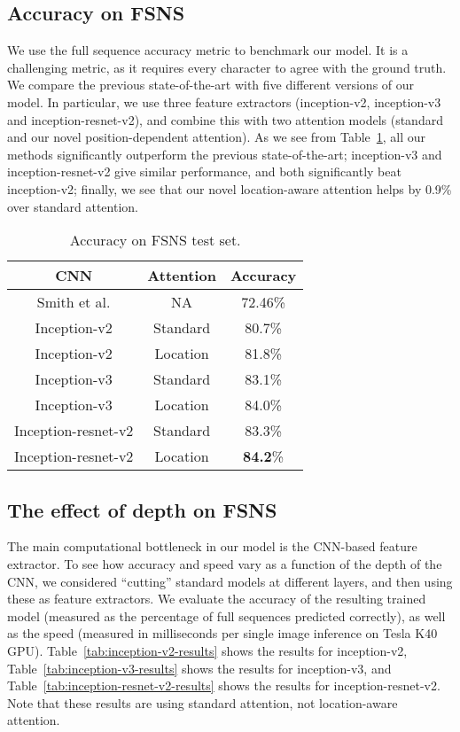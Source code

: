 \documentclass[conference]{IEEEtran}
\begin{document}
\subsection{Accuracy on FSNS}
\label{sec:accuracy}

We use the full sequence accuracy metric to benchmark our model. It is
a challenging metric, as it requires every character to agree with the
ground truth.  
We compare
the previous state-of-the-art \cite{smith2016end}
with five different versions of our model.
In particular, we use three feature extractors
(inception-v2, inception-v3 and inception-resnet-v2),
and combine this 
 with two attention
models (standard and  our novel position-dependent attention).
As we see from Table~\ref{tab:results},
all our methods significantly outperform the
previous state-of-the-art;
inception-v3 and inception-resnet-v2  give similar performance,
and both significantly beat
inception-v2;
finally, 
we see that our novel location-aware attention helps by 0.9\%
over standard attention.

\begin{table}[t]
\caption{Accuracy on FSNS test set.}
\label{tab:results}
\begin{center}
\begin{tabular}{| c | c | c |}  \hline
  CNN & Attention & Accuracy \\ \hline
Smith et al. \cite{smith2016end} & NA & 72.46\% \\ 
Inception-v2 & Standard & 80.7\% \\  
Inception-v2 & Location & 81.8\% \\
Inception-v3 & Standard & 83.1\% \\  
Inception-v3 & Location & 84.0\% \\
Inception-resnet-v2 & Standard & 83.3\% \\  
Inception-resnet-v2 & Location & {\bf 84.2}\% \\
\hline
\end{tabular}
\end{center}
\end{table}


\subsection{The effect of depth on FSNS}
\label{sec:cuts}

The main computational bottleneck in our model is the CNN-based
feature extractor. To see how accuracy and speed vary as a function of
the depth of the CNN, we considered ``cutting'' standard models at
different layers, and then using these as feature extractors.
We evaluate the accuracy of the resulting
trained model (measured as the percentage  of
full sequences predicted correctly),
as well as the speed (measured in milliseconds per single image inference on Tesla K40 GPU).
Table~\ref{tab:inception-v2-results} shows the results for 
inception-v2,
Table~\ref{tab:inception-v3-results}
shows the results for inception-v3,
and Table~\ref{tab:inception-resnet-v2-results}
shows the results for inception-resnet-v2.
Note that these results are using standard attention,
not location-aware attention.
\end{document}
